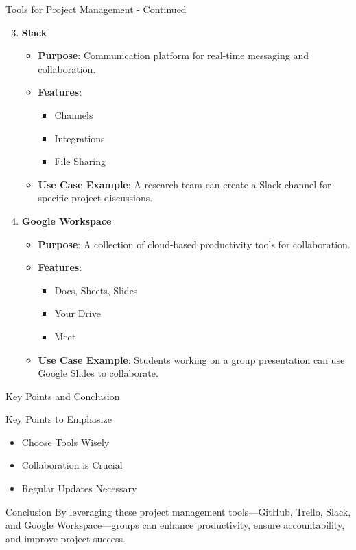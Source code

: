 \documentclass[aspectratio=169]{beamer}
\begin{document}
\begin{frame}[fragile]{Tools for Project Management - Continued}
    \begin{enumerate}
        \setcounter{enumi}{2}
        \item \textbf{Slack}
        \begin{itemize}
            \item \textbf{Purpose}: Communication platform for real-time messaging and collaboration.
            \item \textbf{Features}:
            \begin{itemize}
                \item Channels
                \item Integrations
                \item File Sharing
            \end{itemize}
            \item \textbf{Use Case Example}: A research team can create a Slack channel for specific project discussions.
        \end{itemize}
        
        \item \textbf{Google Workspace}
        \begin{itemize}
            \item \textbf{Purpose}: A collection of cloud-based productivity tools for collaboration.
            \item \textbf{Features}:
            \begin{itemize}
                \item Docs, Sheets, Slides
                \item Your Drive
                \item Meet
            \end{itemize}
            \item \textbf{Use Case Example}: Students working on a group presentation can use Google Slides to collaborate.
        \end{itemize}
    \end{enumerate}
\end{frame}

\begin{frame}[fragile]{Key Points and Conclusion}
    \begin{block}{Key Points to Emphasize}
        \begin{itemize}
            \item Choose Tools Wisely
            \item Collaboration is Crucial
            \item Regular Updates Necessary
        \end{itemize}
    \end{block}
    
    \begin{block}{Conclusion}
        By leveraging these project management tools—GitHub, Trello, Slack, and Google Workspace—groups can enhance productivity, ensure accountability, and improve project success.
    \end{block}
\end{frame}
\end{document}
